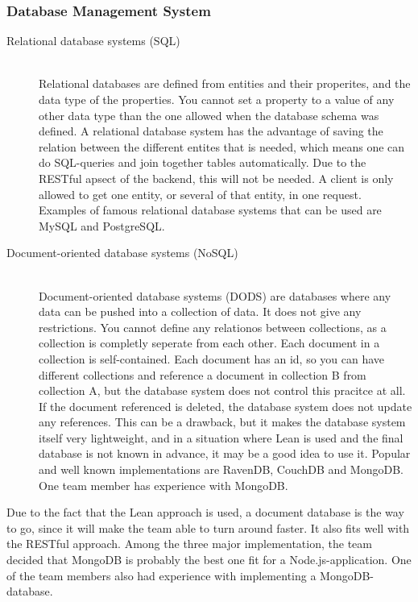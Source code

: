 \subsubsection{Database Management System}

\begin{description}
    \item[Relational database systems (SQL)] \hfill \\
        Relational databases are defined from entities and their properites, and the data type of the properties. You cannot set a property to a value of any other data type than the one allowed when the database schema was defined. A relational database system has the advantage of saving the relation between the different entites that is needed, which means one can do SQL-queries and join together tables automatically. Due to the RESTful apsect of the backend, this will not be needed. A client is only allowed to get one entity, or several of that entity, in one request. Examples of famous relational database systems that can be used are MySQL and PostgreSQL. 
    \item[Document-oriented database systems (NoSQL)] \hfill \\
        Document-oriented database systems (DODS) are databases where any data can be pushed into a collection of data. It does not give any restrictions. You cannot define any relationos between collections, as a collection is completly seperate from each other. Each document in a collection is self-contained.\cite{document-databases} Each document has an id, so you can have different collections and reference a document in collection B from collection A, but the database system does not control this pracitce at all. If the document referenced is deleted, the database system does not update any references. This can be a drawback, but it makes the database system itself very lightweight, and in a situation where Lean is used and the final database is not known in advance, it may be a good idea to use it. Popular and well known implementations are RavenDB, CouchDB and MongoDB. One team member has experience with MongoDB.
\end{description}


Due to the fact that the Lean approach is used, a document database is the way to go, since it will make the team able to turn around faster. It also fits well with the RESTful approach. Among the three major implementation, the team decided that MongoDB is probably the best one fit for a Node.js-application.\cite{node-mongodb-driver} One of the team members also had experience with implementing a MongoDB-database.


